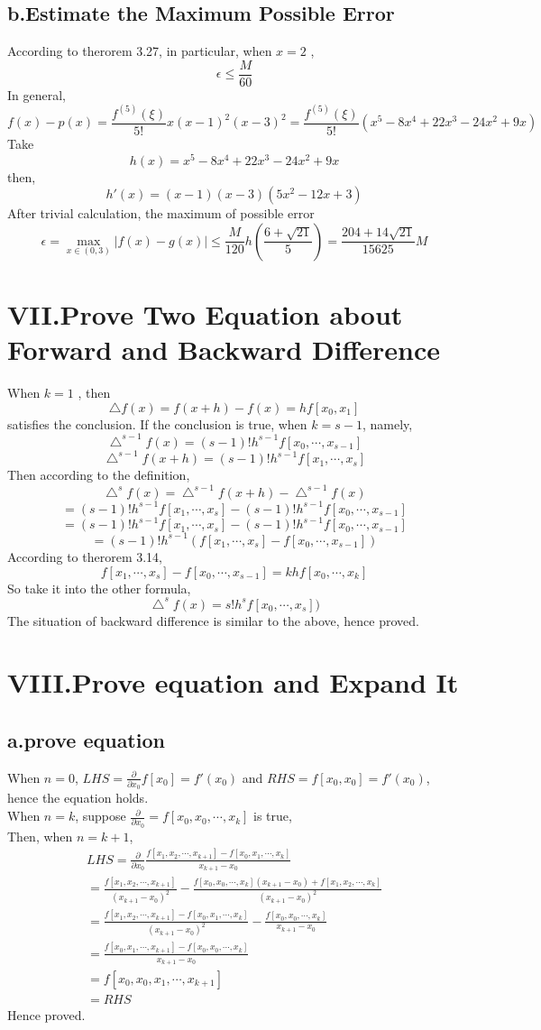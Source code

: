 \documentclass[twoside,a4paper,12pt]{article}
\begin{document}
\subsection*{b.Estimate the Maximum Possible Error}
According to therorem 3.27, in particular, when $x=2$ ,
\[
\epsilon \leq \frac{M}{60}
\]
In general,
\[
f(x)-p(x)=\frac{f^{(5)}(\xi)}{5!}x(x-1)^{2}(x-3)^2=\frac{f^{(5)}(\xi)}{5!}(x^5-8x^4+22x^3-24x^2+9x)
\]
Take
\[
h(x)=x^5-8x^4+22x^3-24x^2+9x
\]
then,
\[
h'(x)=(x-1)(x-3)(5x^2-12x+3)
\]
After trivial calculation, the maximum of possible error  
\[
\epsilon=\max_{x\in(0,3)}{|f(x)-g(x)|}\leq\frac{M}{120}h(\frac{6+\sqrt{21}}{5})=\frac{204+14\sqrt{21}}{15625}M
\]
\section*{VII.Prove Two Equation about Forward and Backward Difference}
When $k=1$ , then
\[
\bigtriangleup f(x)=f(x+h)-f(x)=hf[x_0,x_1]
\]
satisfies the conclusion.
If the conclusion is true, when $k=s-1$, namely,
\[
\bigtriangleup^{s-1}f(x)=(s-1)!h^{s-1}f[x_0,\cdots,x_{s-1}]
\]
\[
\bigtriangleup^{s-1}f(x+h)=(s-1)!h^{s-1}f[x_1,\cdots,x_{s}]
\]
Then according to the definition,
\[
\bigtriangleup^{s}f(x)=\bigtriangleup^{s-1}f(x+h)-\bigtriangleup^{s-1}f(x)
\]
\[
=(s-1)!h^{s-1}f[x_1,\cdots,x_{s}]-(s-1)!h^{s-1}f[x_0,\cdots,x_{s-1}]
\]
\[
=(s-1)!h^{s-1}f[x_1,\cdots,x_{s}]-(s-1)!h^{s-1}f[x_0,\cdots,x_{s-1}]
\]
\[
=(s-1)!h^{s-1}(f[x_1,\cdots,x_{s}]-f[x_0,\cdots,x_{s-1}])
\]
According to therorem 3.14,
\[
f[x_1,\cdots,x_{s}]-f[x_0,\cdots,x_{s-1}]=khf[x_0,\cdots,x_k]
\]
So take it into the other formula,
\[
\bigtriangleup^{s}f(x) = s!h^{s}f[x_0,\cdots,x_{s}])
\]
The situation of backward difference is similar to the above, hence proved.

\section*{VIII.Prove equation and Expand It}
\subsection*{a.prove equation}
When $n=0$, $LHS=\frac{\partial}{\partial{x_0}}f[x_0]=f'(x_0)$ and $RHS = f[x_0,x_0]=f'(x_0)$, hence the equation holds.\\
When $n=k$, suppose $\frac{\partial}{\partial{x_0}}=f[x_0,x_0,\cdots,x_k]$ is true,\\
Then, when $n=k+1$,
\begin{gather}
LHS=\frac{\partial}{\partial{x_0}}\frac{f[x_1,x_2,\cdots,x_{k+1}]-f[x_0,x_1,\cdots,x_k]}{x_{k+1}-x_0} \\
=\frac{f[x_1,x_2,\cdots,x_{k+1}]}{(x_{k+1}-x_0)^2}-\frac{f[x_0,x_0,\cdots,x_k](x_{k+1}-x_0)+f[x_1,x_2,\cdots,x_k]}{(x_{k+1}-x_0)^2}\\
=\frac{f[x_1,x_2,\cdots,x_{k+1}]-f[x_0,x_1,\cdots,x_k]}{(x_{k+1}-x_0)^2}-\frac{f[x_0,x_0,\cdots,x_k]}{x_{k+1}-x_0}\\
=\frac{f[x_0,x_1,\cdots,x_{k+1}]-f[x_0,x_0,\cdots,x_k]}{x_{k+1}-x_0}\\
=f[x_0,x_0,x_1,\cdots,x_{k+1}]\\
=RHS
\end{gather}
Hence proved.
\end{document}
